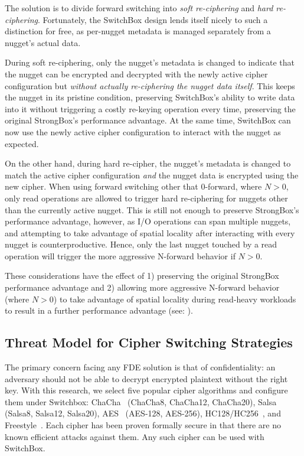 The solution is to divide forward switching into \emph{soft re-ciphering} and
\emph{hard re-ciphering}. Fortunately, the SwitchBox design lends itself nicely
to such a distinction for free, as per-nugget metadata is managed separately
from a nugget's actual data.

During soft re-ciphering, only the nugget's metadata is changed to indicate that
the nugget can be encrypted and decrypted with the newly active cipher
configuration but \emph{without actually re-ciphering the nugget data itself}.
This keeps the nugget in its pristine condition, preserving SwitchBox's ability
to write data into it without triggering a costly re-keying operation every
time, preserving the original StrongBox's performance advantage. At the same
time, SwitchBox can now use the newly active cipher configuration to interact
with the nugget as expected.

On the other hand, during hard re-cipher, the nugget's metadata is changed to
match the active cipher configuration \emph{and} the nugget data is encrypted
using the new cipher. When using forward switching other that 0-forward,
 where $N > 0$, only read operations are allowed to trigger hard
re-ciphering for nuggets other than the currently active nugget. This is still
not enough to preserve StrongBox's performance advantage, however, as I/O
operations can span multiple nuggets, and attempting to take advantage of
spatial locality after interacting with every nugget is counterproductive.
Hence, only the last nugget touched by a read operation will trigger the more
aggressive N-forward behavior if $N > 0$.

These considerations have the effect of 1) preserving the original StrongBox
performance advantage and 2) allowing more aggressive N-forward behavior (where
$N > 0$) to take advantage of spatial locality during read-heavy workloads to
result in a further performance advantage (see: ).

\subsection{Threat Model for Cipher Switching Strategies}

The primary concern facing any FDE solution is that of confidentiality: an
adversary should not be able to decrypt encrypted plaintext without the right
key. With this research, we select five popular cipher algorithms and configure
them under Switchbox: ChaCha~\cite{ChaCha20} (ChaCha8, ChaCha12, ChaCha20),
Salsa~\cite{SalsaX} (Salsa8, Salsa12, Salsa20), AES~\cite{AES} (AES-128,
AES-256), HC128/HC256~\cite{HCX}, and Freestyle~\cite{Freestyle}. Each cipher
has been proven formally secure in that there are no known efficient attacks
against them. Any such cipher can be used with SwitchBox.

